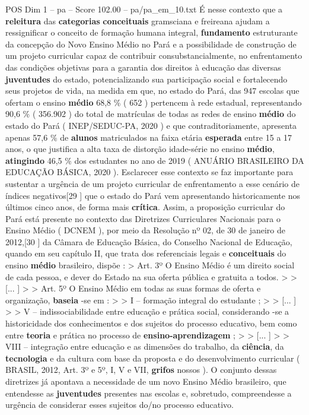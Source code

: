\begin{textsample}{POS Dim 1 – pa – Score 102.00 – pa/pa\_em\_10.txt}
É nesse contexto que a \textbf{releitura} das \textbf{categorias} \textbf{conceituais} gramsciana e freireana ajudam a ressignificar o conceito de formação humana integral, \textbf{fundamento} estruturante da concepção do Novo Ensino Médio no Pará e a possibilidade de construção de um projeto curricular capaz de contribuir consubstancialmente, no enfrentamento das condições objetivas para a garantia dos direitos à educação das diversas \textbf{juventudes} do estado, potencializando sua participação social e fortalecendo seus projetos de vida, na medida em que, no estado do Pará, das 947 escolas que ofertam o ensino \textbf{médio} 68,8 \% ( 652 ) pertencem à rede estadual, representando 90,6 \% ( 356.902 ) do total de matrículas de todas as redes de ensino \textbf{médio} do estado do Pará ( INEP/SEDUC-PA, 2020 ) e que contraditoriamente, apresenta apenas 57,6 \% de \textbf{alunos} matriculados na faixa etária \textbf{esperada} entre 15 a 17 anos, o que justifica a alta taxa de distorção idade-série no ensino \textbf{médio}, \textbf{atingindo} 46,5 \% dos estudantes no ano de 2019 ( ANUÁRIO BRASILEIRO DA EDUCAÇÃO BÁSICA, 2020 ).
Esclarecer esse contexto se faz importante para sustentar a urgência de um projeto curricular de enfrentamento a esse cenário de índices negativos[29 ] que o estado do Pará vem apresentando historicamente nos últimos cinco anos, de forma mais \textbf{crítica}.
Assim, a proposição curricular do Pará está presente no contexto das Diretrizes Curriculares Nacionais para o Ensino Médio ( DCNEM ), por meio da Resolução nº 02, de 30 de janeiro de 2012,[30 ] da Câmara de Educação Básica, do Conselho Nacional de Educação, quando em seu capítulo II, que trata dos referenciais legais e \textbf{conceituais} do ensino \textbf{médio} brasileiro, dispõe : > Art. 3º O Ensino Médio é um direito social de cada pessoa, e dever do Estado na sua oferta pública e gratuita a todos. > > [... ] > > Art. 5º O Ensino Médio em todas as suas formas de oferta e organização, \textbf{baseia} -se em : > > I – formação integral do estudante ; > > [... ] > > V – indissociabilidade entre educação e prática social, considerando -se a historicidade dos conhecimentos e dos sujeitos do processo educativo, bem como entre \textbf{teoria} e prática no processo de \textbf{ensino-aprendizagem} ; > > [... ] > > VIII – integração entre educação e as dimensões do trabalho, da \textbf{ciência}, da \textbf{tecnologia} e da cultura com base da proposta e do desenvolvimento curricular ( BRASIL, 2012, Art. 3º e 5º, I, V e VII, \textbf{grifos} nossos ).
O conjunto dessas diretrizes já apontava a necessidade de um novo Ensino Médio brasileiro, que entendesse as \textbf{juventudes} presentes nas escolas e, sobretudo, compreendesse a urgência de considerar esses sujeitos do/no processo educativo.

\end{textsample}
